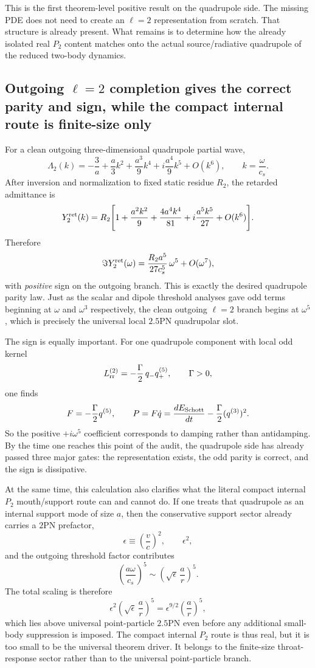 \documentclass[11pt]{article}
\begin{document}
This is the first theorem-level positive result on the quadrupole side.  The
missing PDE does not need to create an $\ell=2$ representation from scratch.
That structure is already present.  What remains is to determine how the already
isolated real $P_2$ content matches onto the actual source/radiative quadrupole
of the reduced two-body dynamics.

\subsection{Outgoing \texorpdfstring{$\ell=2$}{ell=2} completion gives the correct parity and sign, while the compact internal route is finite-size only}
\label{sec:quadrupole-surviving-outgoing}

For a clean outgoing three-dimensional quadrupole partial wave,
\[
\Lambda_2(k)
=
-\frac{3}{a}
+\frac{a}{3}k^2
+\frac{a^3}{9}k^4
+i\frac{a^4}{9}k^5
+O(k^6),
\qquad
k=\frac{\omega}{c_s}.
\]
After inversion and normalization to fixed static residue $R_2$, the retarded
admittance is
\[
Y_2^{\rm ret}(k)
=
R_2\Biggl[
1+\frac{a^2k^2}{9}
+\frac{4a^4k^4}{81}
+i\frac{a^5k^5}{27}
+O(k^6)
\Biggr].
\]
Therefore
\[
\Im Y_2^{\rm ret}(\omega)
=
\frac{R_2a^5}{27c_s^5}\,\omega^5+O(\omega^7),
\]
with \emph{positive} sign on the outgoing branch.  This is exactly the desired
quadrupole parity law.  Just as the scalar and dipole threshold analyses gave
odd terms beginning at $\omega$ and $\omega^3$ respectively, the clean outgoing
$\ell=2$ branch begins at $\omega^5$, which is precisely the universal local
$2.5$PN quadrupolar slot.

The sign is equally important.  For one quadrupole component with local odd
kernel
\[
L_{\rm rr}^{(2)}=-\frac{\Gamma}{2}\,q_-q_+^{(5)},
\qquad
\Gamma>0,
\]
one finds
\[
F=-\frac{\Gamma}{2}q^{(5)},
\qquad
P=F\dot q
=\frac{dE_{\rm Schott}}{dt}-\frac{\Gamma}{2}(q^{(3)})^2.
\]
So the positive $+i\omega^5$ coefficient corresponds to damping rather than
antidamping.  By the time one reaches this point of the audit, the quadrupole
side has already passed three major gates: the representation exists, the odd
parity is correct, and the sign is dissipative.

At the same time, this calculation also clarifies what the literal compact
internal $P_2$ mouth/support route can and cannot do.  If one treats that
quadrupole as an internal support mode of size $a$, then the conservative
support sector already carries a $2$PN prefactor,
\[
\epsilon\equiv\left(\frac{v}{c}\right)^2,
\qquad
\epsilon^2,
\]
and the outgoing threshold factor contributes
\[
\left(\frac{a\omega}{c_s}\right)^5
\sim
\left(\sqrt\epsilon\,\frac{a}{r}\right)^5.
\]
The total scaling is therefore
\[
\epsilon^2\left(\sqrt\epsilon\,\frac{a}{r}\right)^5
=
\epsilon^{9/2}\left(\frac{a}{r}\right)^5,
\]
which lies above universal point-particle $2.5$PN even before any additional
small-body suppression is imposed.  The compact internal $P_2$ route is thus
real, but it is too small to be the universal theorem driver.  It belongs to the
finite-size throat-response sector rather than to the universal point-particle
branch.
\end{document}

